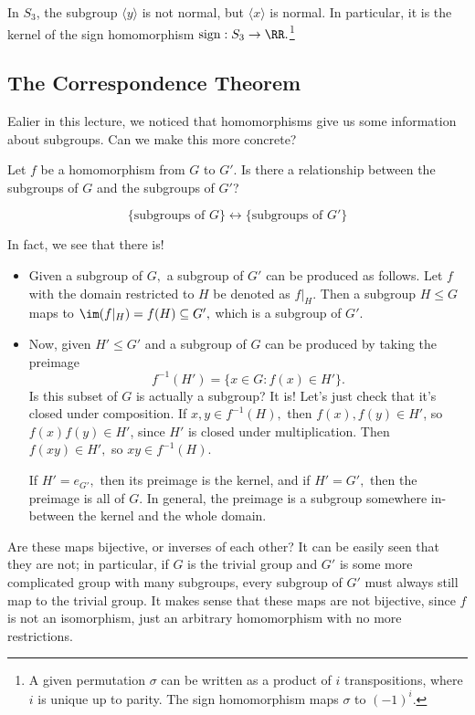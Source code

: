 \begin{example}
In $S_3$, the subgroup $\langle y \rangle $ is not normal, but $\langle x \rangle$ is normal. In particular, it is the kernel of the sign homomorphism $\text{sign}: S_3 \rightarrow \RR.$\footnote{A given permutation $\sigma$ can be written as a product of $i$ transpositions, where $i$ is unique up to parity. The sign homomorphism maps $\sigma$ to $(-1)^i.$} 
\end{example}

\subsection{The Correspondence Theorem}
Ealier in this lecture, we noticed that homomorphisms give us some information about subgroups. Can we make this more concrete?
\begin{qq}
Let $f$ be a homomorphism from $G$ to $G'$. Is there a relationship between the subgroups of $G$ and the subgroups of $G'$?

\[
\{\text{subgroups of $G$}\} \leftrightarrow \{\text{subgroups of $G'$}\}
\]
\end{qq}
\begin{ans}
In fact, we see that there is!
\begin{itemize}
    \item Given a subgroup of $G,$ a subgroup of $G'$ can be produced as follows. Let $f$ with the domain restricted to $H$ be denoted as $f|_H.$  Then a subgroup $H \leq G$ maps to $\im(f|_H) = f(H) \subseteq G',$ which is a subgroup of $G'.$
    
    \item Now, given $H' \leq G'$ and a subgroup of $G$ can be produced by taking the preimage 
    \[
    f^{-1}(H') = \{x \in G : f(x) \in H'\}.
    \]
    Is this subset of $G$ is actually a subgroup? It is! Let's just check that it's closed under composition. If $x, y \in f^{-1}(H),$ then $f(x), f(y) \in H'$, so $f(x)f(y) \in H'$, since $H'$ is closed under multiplication. Then $f(xy) \in H',$ so $xy \in f^{-1}(H).$ 
    
    If $H' = e_{G'},$ then its preimage is the kernel, and if $H' = G',$ then the preimage is all of $G.$ In general, the preimage is a subgroup somewhere in-between the kernel and the whole domain.
\end{itemize}
\end{ans}


Are these maps bijective, or inverses of each other? It can be easily seen that they are not; in particular, if $G$ is the trivial group and $G'$ is some more complicated group with many subgroups, every subgroup of $G'$ must always still map to the trivial group. It makes sense that these maps are not bijective, since $f$ is not an isomorphism, just an arbitrary homomorphism with no more restrictions. 

